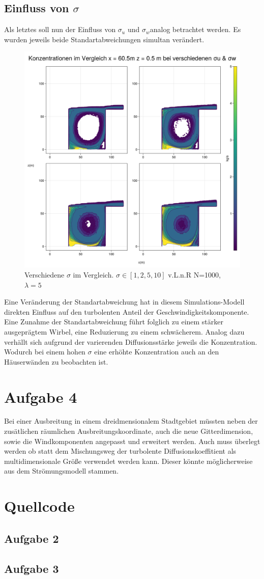 \documentclass[ngerman]{scrartcl}
\begin{document}
\subsection{Einfluss von $\sigma$ }
Als letztes soll nun der Einfluss von $\sigma_u$ und $\sigma_w$analog betrachtet werden. Es wurden jeweils beide Standartabweichungen simultan verändert.
\begin{figure}[H]
	\centering
	\includegraphics[scale=0.25]{Bilder/3_sigma_x = 60.5.png}
	\caption{Verschiedene $\sigma$ im Vergleich. $\sigma \in[1,2 ,5,10]$ v.L.n.R N=1000, $\lambda =5$}
	\label{fig:my_label}
\end{figure}
Eine Veränderung der Standartabweichung hat in diesem Simulations-Modell direkten Einfluss auf den turbolenten Anteil der Geschwindigkeitskomponente. Eine Zunahme der Standartabweichung führt folglich zu einem stärker ausgeprägtem Wirbel, eine Reduzierung zu einem schwächerem. Analog dazu verhällt sich aufgrund der varierenden Diffusionsstärke jeweils die Konzentration. Wodurch bei einem hohen $\sigma$ eine erhöhte Konzentration auch an den Häuserwänden zu beobachten ist.
\section{Aufgabe  4}
Bei einer Ausbreitung in einem dreidmensionalem Stadtgebiet müssten neben der zusätlichen räumlichen Ausbreitungskoordinate, auch die neue Gitterdimension, sowie die Windkomponenten angepasst und erweitert werden. Auch muss überlegt werden ob statt dem Mischungsweg  der turbolente Diffusionskoeffitient als multidimensionale Größe verwendet werden kann. Dieser könnte möglicherweise aus dem Strömungsmodell stammen.
\newpage
\section{Quellcode}
\subsection{Aufgabe 2}

\subsection{Aufgabe 3}

\end{document}

